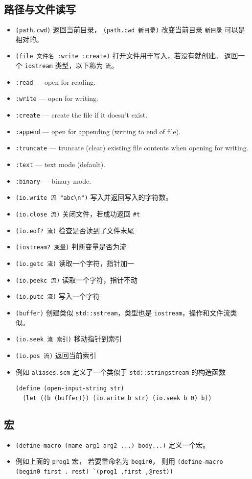 \subsection{路径与文件读写}
\begin{itemize}
\item \verb`(path.cwd)` 返回当前目录， \verb`(path.cwd 新目录)` 改变当前目录 \verb`新目录` 可以是相对的。
\item \verb`(file 文件名 :write :create)` 打开文件用于写入，若没有就创建。 返回一个 \verb`iostream` 类型，以下称为 \verb`流`。
\item \verb`:read` — open for reading.
\item \verb`:write` — open for writing.
\item \verb`:create` — create the file if it doesn’t exist.
\item \verb`:append` — open for appending (writing to end of file).
\item \verb`:truncate` — truncate (clear) existing file contents when opening for writing.
\item \verb`:text` — text mode (default).
\item \verb`:binary` — binary mode.
\item \verb`(io.write 流 "abc\n")` 写入并返回写入的字符数。
\item \verb`(io.close 流)` 关闭文件，若成功返回 \verb`#t`
\item \verb`(io.eof? 流)` 检查是否读到了文件末尾
\item \verb`(iostream? 变量)` 判断变量是否为流
\item \verb`(io.getc 流)` 读取一个字符，指针加一
\item \verb`(io.peekc 流)` 读取一个字符，指针不动
\item \verb`(io.putc 流)` 写入一个字符
\item \verb`(buffer)` 创建类似 \verb`std::sstream`，类型也是 \verb`iostream`，操作和文件流类似。
\item \verb`(io.seek 流 索引)` 移动指针到索引
\item \verb`(io.pos 流)` 返回当前索引
\item 例如 \verb`aliases.scm` 定义了一个类似于 \verb`std::stringstream` 的构造函数
\begin{lstlisting}[language=none]
(define (open-input-string str)
  (let ((b (buffer))) (io.write b str) (io.seek b 0) b))
\end{lstlisting}
\end{itemize}


\subsection{宏}
\begin{itemize}
\item \verb`(define-macro (name arg1 arg2 ...) body...)` 定义一个宏。
\item 例如上面的 \verb`prog1` 宏， 若要重命名为 \verb`begin0`， 则用 \verb|(define-macro (begin0 first . rest) `(prog1 ,first ,@rest))|
\end{itemize}

